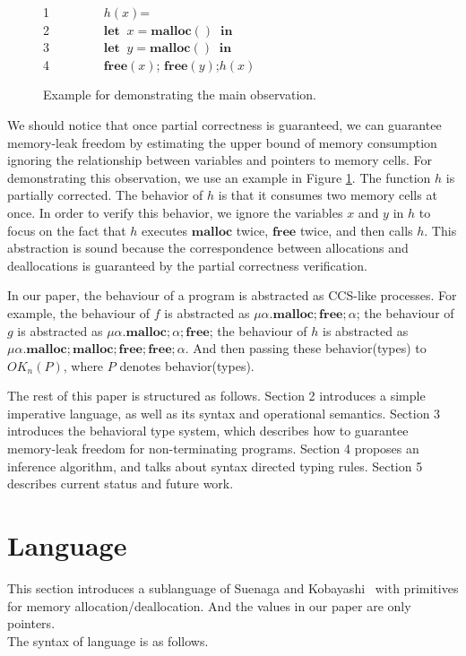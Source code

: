 \documentclass[english]{jssst_ppl} %
\newcommand\LET{\mathbf{let}\;}
\newcommand\IN{\mathbf{in}\;}
\newcommand\MALLOC{\mathbf{malloc()}\;}
\newcommand\Malloc{\mathbf{malloc}}
\newcommand\Free{\mathbf{free}}
\newcommand\Cirx{(x)}
\newcommand\dtb{\;\;\ \;\;\ \;\;\ \;\;\  }
\begin{document}
\begin{figure}[h]
1\dtb \dtb \;\; $h(x)$=\\
2\dtb \dtb\;\; $\LET \; x = \MALLOC  \; \IN$\\
3\dtb \dtb\;\; $\LET \; y = \MALLOC  \; \IN$\\
4\dtb \dtb\;\; $\Free\Cirx$; \; $\Free(y) $;\;$h(x)$
\caption{Example for demonstrating the main observation.}
\label{example:observation}
\end{figure}

We should notice that once partial correctness is guaranteed, we can guarantee memory-leak freedom by estimating the upper bound of memory consumption ignoring the relationship between variables and pointers to memory cells. For demonstrating this observation, we use an example in Figure \ref{example:observation}. The function $h$ is partially corrected. The behavior of $h$ is that it consumes two memory cells at once. In order to verify this behavior, we ignore the variables $x$ and $y$ in $h$ to focus on the fact that $h$ executes $\Malloc$ twice, $\Free$ twice, and then calls $h$. This abstraction is sound because the correspondence between allocations and deallocations is guaranteed by the partial correctness verification.

In our paper, the behaviour of a program is abstracted as CCS-like processes. For example, the behaviour of $f$ is abstracted as $\mu \alpha. \Malloc;\Free;\alpha$; the behaviour of $g$ is abstracted as $\mu \alpha. \Malloc;\alpha;\Free$; the behaviour of $h$ is abstracted as $\mu \alpha. \Malloc;\Malloc;\Free;\Free;\alpha$. And then passing these behavior(types) to $OK_{n}(P)$, where $P$ denotes  behavior(types).

The rest of this paper is structured as follows. Section 2 introduces a simple imperative language, as well as its syntax and operational semantics. Section 3 introduces the behavioral type system, which describes how to guarantee memory-leak freedom for non-terminating programs. Section 4 proposes an inference algorithm, and talks about syntax directed typing rules. Section 5 describes current status and future work.

\section{Language}
This section introduces a sublanguage of Suenaga and Kobayashi~\cite{DBLP:conf/aplas/SuenagaK09} with primitives for memory allocation/deallocation. And the values in our paper are only pointers. \\
The syntax of language is as follows.
\end{document}
